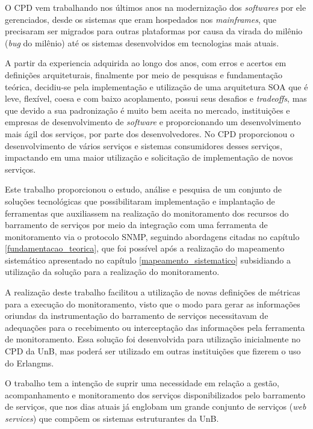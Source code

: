 \label{conclusao}

O \acrshort{CPD} vem trabalhando nos últimos anos na modernização dos \textit{softwares} por ele gerenciados, desde os sistemas que eram hospedados nos \textit{mainframes}, que precisaram ser migrados para outras plataformas por causa da virada do milênio (\textit{bug} do milênio) até os sistemas desenvolvidos em tecnologias mais atuais. 

A partir da experiencia adquirida ao longo dos anos, com erros e acertos em definições arquiteturais, finalmente por meio de pesquisas e fundamentação teórica, decidiu-se pela implementação e utilização de uma arquitetura \acrshort{SOA} que é leve, flexível, coesa e com baixo acoplamento, possui seus desafios e \textit{tradeoffs}, mas que devido a sua padronização é muito bem aceita no mercado, instituições e empresas de desenvolvimento de \textit{software} e proporcionando um desenvolvimento mais ágil dos serviços, por parte dos desenvolvedores. No \acrshort{CPD} proporcionou o desenvolvimento de vários serviços e sistemas consumidores desses serviços, impactando em uma maior utilização e solicitação de implementação de novos serviços.      

Este trabalho proporcionou o estudo, análise e pesquisa de um conjunto de soluções tecnológicas que possibilitaram implementação e implantação de ferramentas que auxiliassem na realização do monitoramento dos recursos do barramento de serviços por meio da integração com uma ferramenta de monitoramento via o protocolo \acrshort{SNMP}, seguindo  abordagens citadas no capítulo \ref{fundamentacao_teorica}, que foi possível após a realização do mapeamento sistemático apresentado no capítulo \ref{mapeamento_sistematico} subsidiando a utilização da solução para a realização do monitoramento.  

A realização deste trabalho facilitou a utilização de novas definições de métricas para a execução do monitoramento, visto que o modo para gerar as informações oriundas da instrumentação do barramento de serviços necessitavam de adequações para o recebimento ou interceptação das informações pela ferramenta de monitoramento. Essa solução foi desenvolvida para utilização inicialmente no \acrshort{CPD} da \acrshort{UnB}, mas poderá ser utilizado em outras instituições que fizerem o uso do Erlangms. 

O trabalho tem a intenção de suprir uma necessidade em relação a gestão, acompanhamento e monitoramento dos serviços disponibilizados pelo barramento de serviços, que nos dias atuais já englobam um grande conjunto de serviços (\textit{web services}) que compõem os sistemas estruturantes da \acrshort{UnB}.


